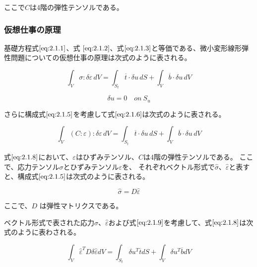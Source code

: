 \documentclass[a4paper,pandoc,ja=standard]{bxjsarticle}
\begin{document}
ここで\(C\)は4階の弾性テンソルである。

\hypertarget{ux4eeeux60f3ux4ed5ux4e8bux306eux539fux7406}{%
\subsubsection{仮想仕事の原理}\label{ux4eeeux60f3ux4ed5ux4e8bux306eux539fux7406}}

基礎方程式\(\eqref{eq:2.1.1}\)、式 \(\eqref{eq:2.1.2}\)、式\(\eqref{eq:2.1.3}\)と等価である、微小変形線形弾性問題についての仮想仕事の原理は次式のように表される。

\begin{equation}
\int_V \sigma : \delta \varepsilon\, dV = \int_{S_t} \overline{t} \cdot \delta u\, dS + \int_V \overline{b} \cdot \delta u\,dV
\label{eq:2.1.6}
\end{equation}

\begin{equation}
\delta u = 0 \quad on \ S_u
\label{eq:2.1.7}
\end{equation}

さらに構成式\(\eqref{eq:2.1.5}\)を考慮して式\(\eqref{eq:2.1.6}\)は次式のように表される。

\begin{equation}
\int_V (C : \varepsilon) : \delta \varepsilon\, dV = \int_{S_t} \overline{t} \cdot \delta u\, dS + \int_V \overline{b} \cdot \delta u\, dV
\label{eq:2.1.8}
\end{equation}

式\(\eqref{eq:2.1.8}\)において、\(\varepsilon\)はひずみテンソル、\(C\)は4階の弾性テンソルである。
ここで、応力テンソル\(\sigma\)とひずみテンソル\(\varepsilon\)を、
それぞれベクトル形式で\(\hat{\sigma}\)、\(\hat{\varepsilon}\)と表すと、構成式\(\eqref{eq:2.1.5}\)は次式のように表される。

\begin{equation}
\hat{\sigma} = D \hat{\varepsilon}
\label{eq:2.1.9}
\end{equation}

ここで、\(D\) は弾性マトリクスである。

ベクトル形式で表された応力\(\hat{\sigma}\)、\(\hat{\varepsilon}\)および式\(\eqref{eq:2.1.9}\)を考慮して、式\(\eqref{eq:2.1.8}\)は次式のように表わされる。

\begin{equation}
\int_V \hat{\varepsilon}^T D \delta \hat{\varepsilon} dV = \int_{S_t}
\delta u^T \overline{t} dS + \int_V \delta u^T \overline{b} dV
\label{eq:2.1.10}
\end{equation}
\end{document}

